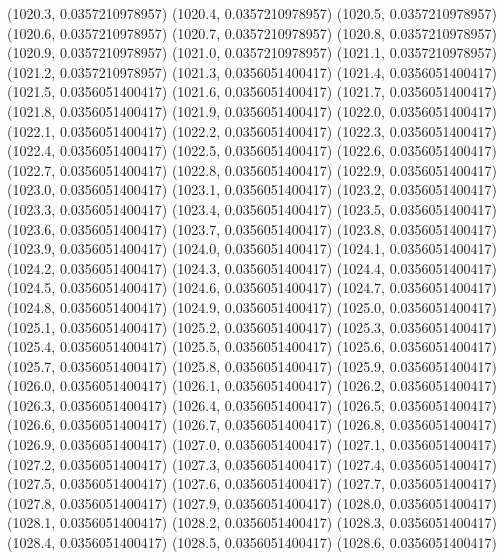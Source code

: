 {					(1020.3, 0.0357210978957)
					(1020.4, 0.0357210978957)
					(1020.5, 0.0357210978957)
					(1020.6, 0.0357210978957)
					(1020.7, 0.0357210978957)
					(1020.8, 0.0357210978957)
					(1020.9, 0.0357210978957)
					(1021.0, 0.0357210978957)
					(1021.1, 0.0357210978957)
					(1021.2, 0.0357210978957)
					(1021.3, 0.0356051400417)
					(1021.4, 0.0356051400417)
					(1021.5, 0.0356051400417)
					(1021.6, 0.0356051400417)
					(1021.7, 0.0356051400417)
					(1021.8, 0.0356051400417)
					(1021.9, 0.0356051400417)
					(1022.0, 0.0356051400417)
					(1022.1, 0.0356051400417)
					(1022.2, 0.0356051400417)
					(1022.3, 0.0356051400417)
					(1022.4, 0.0356051400417)
					(1022.5, 0.0356051400417)
					(1022.6, 0.0356051400417)
					(1022.7, 0.0356051400417)
					(1022.8, 0.0356051400417)
					(1022.9, 0.0356051400417)
					(1023.0, 0.0356051400417)
					(1023.1, 0.0356051400417)
					(1023.2, 0.0356051400417)
					(1023.3, 0.0356051400417)
					(1023.4, 0.0356051400417)
					(1023.5, 0.0356051400417)
					(1023.6, 0.0356051400417)
					(1023.7, 0.0356051400417)
					(1023.8, 0.0356051400417)
					(1023.9, 0.0356051400417)
					(1024.0, 0.0356051400417)
					(1024.1, 0.0356051400417)
					(1024.2, 0.0356051400417)
					(1024.3, 0.0356051400417)
					(1024.4, 0.0356051400417)
					(1024.5, 0.0356051400417)
					(1024.6, 0.0356051400417)
					(1024.7, 0.0356051400417)
					(1024.8, 0.0356051400417)
					(1024.9, 0.0356051400417)
					(1025.0, 0.0356051400417)
					(1025.1, 0.0356051400417)
					(1025.2, 0.0356051400417)
					(1025.3, 0.0356051400417)
					(1025.4, 0.0356051400417)
					(1025.5, 0.0356051400417)
					(1025.6, 0.0356051400417)
					(1025.7, 0.0356051400417)
					(1025.8, 0.0356051400417)
					(1025.9, 0.0356051400417)
					(1026.0, 0.0356051400417)
					(1026.1, 0.0356051400417)
					(1026.2, 0.0356051400417)
					(1026.3, 0.0356051400417)
					(1026.4, 0.0356051400417)
					(1026.5, 0.0356051400417)
					(1026.6, 0.0356051400417)
					(1026.7, 0.0356051400417)
					(1026.8, 0.0356051400417)
					(1026.9, 0.0356051400417)
					(1027.0, 0.0356051400417)
					(1027.1, 0.0356051400417)
					(1027.2, 0.0356051400417)
					(1027.3, 0.0356051400417)
					(1027.4, 0.0356051400417)
					(1027.5, 0.0356051400417)
					(1027.6, 0.0356051400417)
					(1027.7, 0.0356051400417)
					(1027.8, 0.0356051400417)
					(1027.9, 0.0356051400417)
					(1028.0, 0.0356051400417)
					(1028.1, 0.0356051400417)
					(1028.2, 0.0356051400417)
					(1028.3, 0.0356051400417)
					(1028.4, 0.0356051400417)
					(1028.5, 0.0356051400417)
					(1028.6, 0.0356051400417)
}
